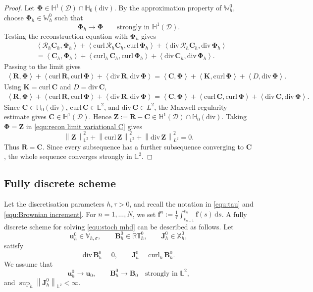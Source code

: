 \documentclass[11pt, reqno]{amsart}
\theoremstyle{definition}
\numberwithin{equation}{section}
\newcommand{\curl}{\mathrm{curl}\,}
\newcommand{\divg}{\mathrm{div}\,}
\newcommand{\bff}{\boldsymbol}
\newcommand{\bb}{\mathbb}
\newcommand{\ds}{\,\mathrm{d}s}
\newcommand{\norm}[2]{\left\|{#1}\right\|_{#2}}
\newcommand{\inpro}[2]{\left\langle#1,#2\right\rangle}
\newcommand{\hzerodiv}{\mathbb{H}_0(\mathrm{div})}
\newcommand{\curlh}{\mathrm{curl}_h\,}
\begin{document}
\begin{proof}
	Let $\bff\Phi\in\bb H^1(\mathscr D)\cap\hzerodiv$. By the approximation property of $\bb W_h^0$, choose $\bff\Phi_h\in\bb W_h^0$ such that
	\[
	\bff\Phi_h\to\bff\Phi
	\qquad\text{strongly in }\bb H^1(\mathscr D).
	\]
	Testing the reconstruction equation with $\bff\Phi_h$ gives
	\begin{align}
		\label{equ:recon equation test}
		&\inpro{\mathcal R_h\bff C_h}{\bff\Phi_h}
		+\inpro{\curl\mathcal R_h\bff C_h}{\curl\bff\Phi_h}
		+\inpro{\divg\mathcal R_h\bff C_h}{\divg\bff\Phi_h}
		\nonumber\\
		&=
		\inpro{\bff C_h}{\bff\Phi_h}
		+\inpro{\curlh\bff C_h}{\curl\bff\Phi_h}
		+\inpro{\divg\bff C_h}{\divg\bff\Phi_h}.
	\end{align}
	Passing to the limit gives
	\begin{align}
		\label{equ:recon limit variational}
		\inpro{\bff R}{\bff\Phi}
		+\inpro{\curl\bff R}{\curl\bff\Phi}
		+\inpro{\divg\bff R}{\divg\bff\Phi}
		=
		\inpro{\bff C}{\bff\Phi}
		+\inpro{\bff K}{\curl\bff\Phi}
		+\inpro{D}{\divg\bff\Phi}.
	\end{align}
	Using $\bff K=\curl\bff C$ and $D=\divg\bff C$,
	\begin{align}
		\label{equ:recon limit variational C}
		\inpro{\bff R}{\bff\Phi}
		+\inpro{\curl\bff R}{\curl\bff\Phi}
		+\inpro{\divg\bff R}{\divg\bff\Phi}
		=
		\inpro{\bff C}{\bff\Phi}
		+\inpro{\curl\bff C}{\curl\bff\Phi}
		+\inpro{\divg\bff C}{\divg\bff\Phi}.
	\end{align}
	Since $\bff C\in\hzerodiv$, $\curl\bff C\in\bb L^2$, and $\divg\bff C\in L^2$, the Maxwell regularity estimate gives $\bff C\in\bb H^1(\mathscr D)$. Hence $\bff Z:=\bff R-\bff C\in \bb H^1(\mathscr D)\cap\hzerodiv$. Taking $\bff\Phi=\bff Z$ in \eqref{equ:recon limit variational C} gives
	\[
	\norm{\bff Z}{\bb L^2}^2+\norm{\curl\bff Z}{\bb L^2}^2+\norm{\divg\bff Z}{L^2}^2=0.
	\]
	Thus $\bff R=\bff C$. Since every subsequence has a further subsequence converging to $\bff C$, the whole sequence converges strongly in $\bb L^2$.
\end{proof}




\subsection{Fully discrete scheme}
\label{subsec:stoch fem scheme}

Let the discretisation parameters $h,\tau>0$, and recall the notation in \eqref{equ:tau} and \eqref{equ:Brownian increment}. For $n=1,\ldots,N$, we set $\bff f^n:= \frac1{\tau} \int_{t_{n-1}}^{t_n} \bff f(s) \ds$. A fully discrete scheme for solving \eqref{equ:stoch mhd} can be described as follows.
Let
\[
\bff u_h^0\in\bb V_{h,\sigma},
\qquad
\bff B_h^0\in\bb{RT}_h^0,
\qquad
\bff J_h^0\in\bb X_h^0,
\]
satisfy
\[
\divg\bff B_h^0=0,
\qquad
\bff J_h^0=\curlh\bff B_h^0.
\]
We assume that
\[
\bff u_h^0\to\bff u_0,
\qquad
\bff B_h^0\to\bff B_0
\quad\text{strongly in }\bb L^2,
\]
and $\sup_h\norm{\bff J_h^0}{\bb L^2}<\infty$.
\end{document}
